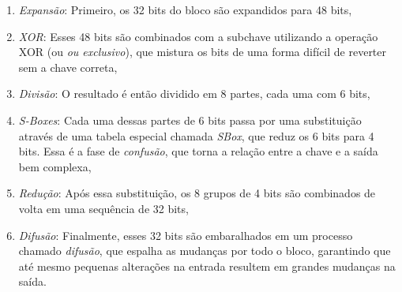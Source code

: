 \begin{enumerate}
    \item {\em Expansão}: Primeiro, os 32 bits do bloco são expandidos para 48 bits,
    \item {\em XOR}: Esses 48 bits são combinados com a subchave utilizando a operação XOR (ou \textit{ou exclusivo}), que mistura os bits de uma forma difícil de reverter sem a chave correta,
    \item {\em Divisão}: O resultado é então dividido em 8 partes, cada uma com 6 bits,
    \item {\em S-Boxes}: Cada uma dessas partes de 6 bits passa por uma substituição através de uma tabela especial chamada \textit{SBox}, que reduz os 6 bits para 4 bits.
      Essa é a fase de \textit{confusão}, que torna a relação entre a chave e a saída bem complexa,
    \item {\em Redução}: Após essa substituição, os 8 grupos de 4 bits são combinados de volta em uma sequência de 32 bits,
    \item {\em Difusão}: Finalmente, esses 32 bits são embaralhados em um processo chamado \textit{difusão}, que espalha as mudanças por todo o bloco, garantindo que até mesmo pequenas alterações na entrada resultem em grandes mudanças na saída.
\end{enumerate}


